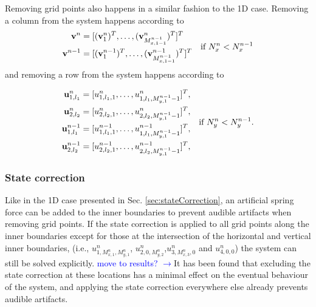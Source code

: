 \documentclass[fleqn]{jaes}
\def\SWcomment[#1]{\textcolor{blue}{#1}}
\begin{document}
Removing grid points also happens in a similar fashion to the 1D case. Removing a column from the system happens according to 
\begin{equation}
\begin{aligned}
    \v^n &= [(\v_1^n)^T, \hdots, (\v_{M_{x,1-1}^{n-1}}^n)^T]^T\\
    \v^{n-1} &= [(\v_1^{n-1})^T, \hdots, (\v_{M_{x,1-1}^{n-1}}^{n-1})^T]^T
    \end{aligned}
\quad \text{if } N_x^n < N_x^{n-1}
\end{equation}
and removing a row from the system happens according to

\begin{equation}
    \begin{aligned}
        \u_{1,l_1}^n &= [u_{1,l_1, 1}^n, \hdots, u_{1,l_1, M_{y,1}^{n-1}-1}^n]^T,\\
        \u_{2,l_2}^n &= [u_{2,l_2, 1}^n,\hdots, u^n_{2,l_2, M_{y, 1}^{n-1}-1}]^T,\\
        \u_{1,l_1}^{n-1} &= [u_{1,l_1, 1}^{n-1}, \hdots, u_{1,l_1, M_{y,1}^{n-1}-1}^{n-1}]^T,\\
        \u_{2,l_2}^{n-1} &= [u_{2,l_2, 1}^{n-1},\hdots, u^{n-1}_{2,l_2, M_{y, 1}^{n-1}-1}]^T,
    \end{aligned}\quad \text{if } N_y^n < N_y^{n-1}.
\end{equation}
\subsubsection{State correction}
Like in the 1D case presented in Sec. \ref{sec:stateCorrection}, an artificial spring force can be added to the inner boundaries to prevent audible artifacts when removing grid points. If the state correction is applied to all grid points along the inner boundaries except for those at the intersection of the horizontal and vertical inner boundaries, (i.e., $u_{1, M_{x,1}^n, M_{y,1}^n}^n$, $u_{2, 0, M_{y,2}^n}^n$,$u_{3, M_{x,3}^n, 0}^n$ and $u_{4, 0, 0}^n$) the system can still be solved explicitly. \SWcomment[move to results? $\rightarrow$]It has been found that excluding the state correction at these locations has a minimal effect on the eventual behaviour of the system, and applying the state correction everywhere else already prevents audible artifacts.  
\end{document}

